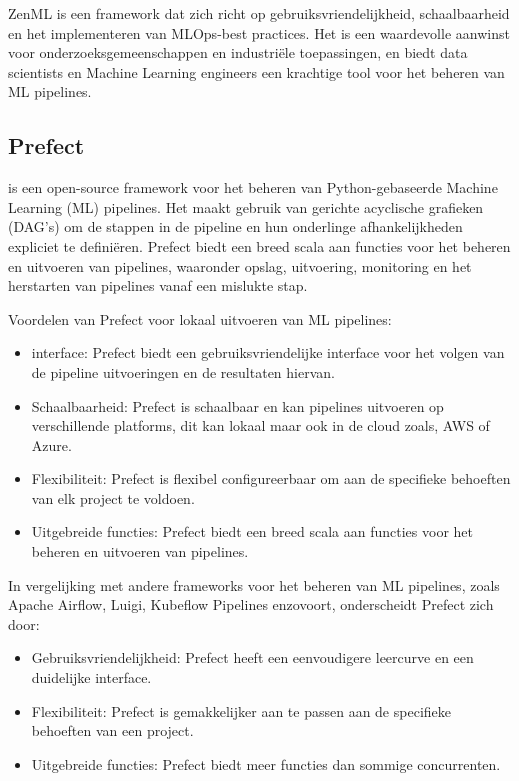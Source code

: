 ZenML is een framework dat zich richt op gebruiksvriendelijkheid, schaalbaarheid en het implementeren van MLOps-best practices. Het is een waardevolle aanwinst voor onderzoeksgemeenschappen en industriële toepassingen, en biedt data scientists en Machine Learning engineers een krachtige tool voor het beheren van ML pipelines.


\subsection{Prefect}

\textcite{Prefect2024} is een open-source framework voor het beheren van Python-gebaseerde Machine Learning (ML) pipelines. Het maakt gebruik van gerichte acyclische grafieken (DAG's) om de stappen in de pipeline en hun onderlinge afhankelijkheden expliciet te definiëren. Prefect biedt een breed scala aan functies voor het beheren en uitvoeren van pipelines, waaronder opslag, uitvoering, monitoring en het herstarten van pipelines vanaf een mislukte stap.

Voordelen van Prefect voor lokaal uitvoeren van ML pipelines:

\begin{itemize}
  \item interface: Prefect biedt een gebruiksvriendelijke interface voor het volgen van de pipeline uitvoeringen en de resultaten hiervan.
  \item Schaalbaarheid: Prefect is schaalbaar en kan pipelines uitvoeren op verschillende platforms, dit kan lokaal maar ook in de cloud zoals, AWS of Azure.
  \item Flexibiliteit: Prefect is flexibel configureerbaar om aan de specifieke behoeften van elk project te voldoen.
  \item Uitgebreide functies: Prefect biedt een breed scala aan functies voor het beheren en uitvoeren van pipelines.
\end{itemize}

In vergelijking met andere frameworks voor het beheren van ML pipelines, zoals Apache Airflow, Luigi, Kubeflow Pipelines enzovoort, onderscheidt Prefect zich door:

\begin{itemize}
  \item Gebruiksvriendelijkheid: Prefect heeft een eenvoudigere leercurve en een duidelijke interface.
  \item Flexibiliteit: Prefect is gemakkelijker aan te passen aan de specifieke behoeften van een project.
  \item Uitgebreide functies: Prefect biedt meer functies dan sommige concurrenten.
\end{itemize}

